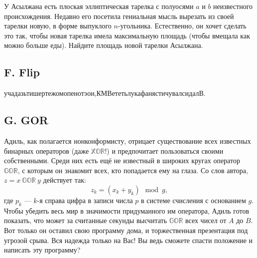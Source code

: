 У Асылжана есть плоская эллиптическая тарелка с полуосями $a$ и $b$ неизвестного происхождения. Недавно его посетила гениальная мысль вырезать из своей тарелки новую, в форме выпуклого $n$-угольника. Естественно, он хочет сделать это так, чтобы новая тарелка имела максимальную площадь (чтобы вмещала как можно больше еды). Найдите площадь новой тарелки Асылжана.






\subsection*{F. Flip}

учадазьтишертежомопенотэон,КМВететьлукафанястичувалсидалВ.






\subsection*{G. GOR}

Адиль, как полагается нонконформисту, отрицает существование всех известных бинарных операторов (даже $\mathbb{XOR}$!) и предпочитает пользоваться своими собственными. Среди них есть ещё не известный в широких кругах оператор $\mathbb{GOR}$, с которым он знакомит всех, кто попадается ему на глаза. Со слов автора, $z = x \ \mathbb{GOR} \ y$ действует так:
$$z_k = (x_k + y_k) \mod g, $$ 
где $p_k$ --- $k$-я справа цифра в записи числа $p$ в системе счисления с основанием $g$. Чтобы убедить весь мир в значимости придуманного им оператора, Адиль готов показать, что может за считанные секунды высчитать $\mathbb{GOR}$ всех чисел от $A$ до $B$. Вот только он оставил свою программу дома, и торжественная презентация под угрозой срыва. Вся надежда только на Вас! Вы ведь сможете спасти положение и написать эту программу?

